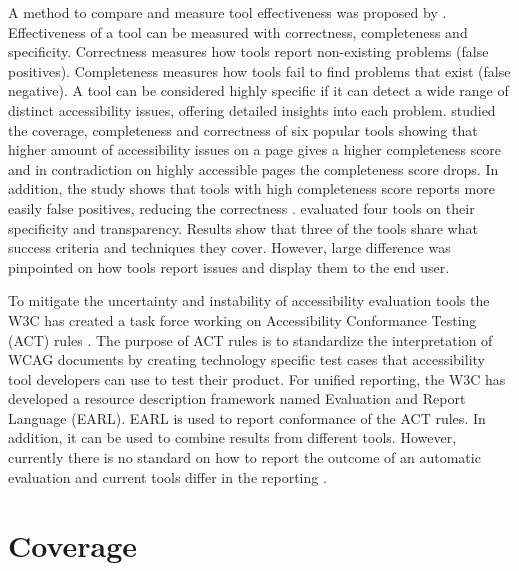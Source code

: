 A method to compare and measure tool effectiveness was proposed by \textcite{Brajnik2004}. Effectiveness of a tool can be measured with correctness, completeness and specificity. Correctness measures how tools report non-existing problems (false positives). Completeness measures how tools fail to find problems that exist (false negative). A tool can be considered highly specific if it can detect a wide range of distinct accessibility issues, offering detailed insights into each problem. \textcite{benchmark_aet} studied the coverage, completeness and correctness of six popular tools showing that higher amount of accessibility issues on a page gives a higher completeness score and in contradiction on highly accessible pages the completeness score drops. In addition, the study shows that tools with high completeness score reports more easily false positives, reducing the correctness \citep{benchmark_aet}. \textcite{tooltransparency} evaluated four tools on their specificity and transparency. Results show that three of the tools share what success criteria and techniques they cover. However, large difference was pinpointed on how tools report issues and display them to the end user.

To mitigate the uncertainty and instability of accessibility evaluation tools the W3C has created a task force working on Accessibility Conformance Testing (ACT) rules \citep{act_overview}. The purpose of ACT rules is to standardize the interpretation of WCAG documents by creating technology specific test cases that accessibility tool developers can use to test their product. For unified reporting, the W3C has developed a resource description framework named Evaluation and Report Language (EARL). EARL is used to report conformance of the ACT rules. In addition, it can be used to combine results from different tools. However, currently there is no standard on how to report the outcome of an automatic evaluation and current tools differ in the reporting \citep{tool_analysis_directive}.

\section{Coverage\label{coverage}}

